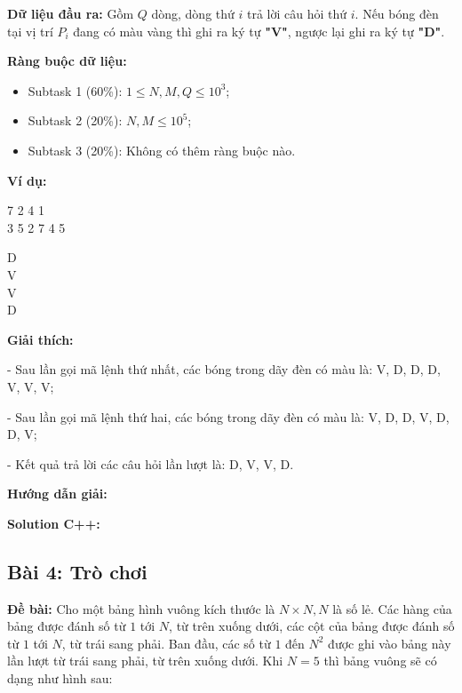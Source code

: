 \documentclass[12pt]{scrartcl}  %
\begin{document}
\textbf{Dữ liệu đầu ra:}
Gồm $Q$ dòng, dòng thứ $i$ trả lời câu hỏi thứ $i$. Nếu bóng đèn tại vị trí $P_i$ đang có màu vàng thì ghi ra ký tự \textbf{"V"}, ngược lại ghi ra ký tự \textbf{"D"}.

\textbf{Ràng buộc dữ liệu:}
\begin{itemize}
    \item Subtask 1 (60\%): $1 \leq N, M, Q \leq 10^3$;
    \item Subtask 2 (20\%): $N, M \leq 10^5$;
    \item Subtask 3 (20\%): Không có thêm ràng buộc nào.
\end{itemize}

\textbf{Ví dụ:}
\begin{tcolorbox}[colback=gray!5!white, colframe=blue!50!black, title=Input]
7 2 4 1\\
3 5
2 7 4 5
\end{tcolorbox}

\begin{tcolorbox}[colback=gray!5!white, colframe=green!50!black, title=Output]
D\\
V\\
V\\
D
\end{tcolorbox}

\textbf{Giải thích:}

- Sau lần gọi mã lệnh thứ nhất, các bóng trong dãy đèn có màu là: V, D, D, D, V, V, V; 

- Sau lần gọi mã lệnh thứ hai, các bóng trong dãy đèn có màu là: V, D, D, V, D, D, V;

- Kết quả trả lời các câu hỏi lần lượt là: D, V, V, D.

\textbf{Hướng dẫn giải:}

\textbf{Solution C++:}

\subsection{Bài 4: Trò chơi}

\textbf{Đề bài:}
Cho một bảng hình vuông kích thước là $N \times N, N$ là số lẻ. Các hàng của bảng được đánh số từ $1$ tới $N$, từ trên xuống dưới, các cột của bảng được đánh số 
từ $1$ tới $N$, từ trái sang phải. Ban đầu, các số từ $1$ đến $N^2$ được ghi vào bảng này lần lượt từ trái sang phải, từ trên xuống dưới. Khi $N = 5$ thì bảng vuông sẽ có dạng như hình sau:

\begin{center}
\end{center}
\end{document}
